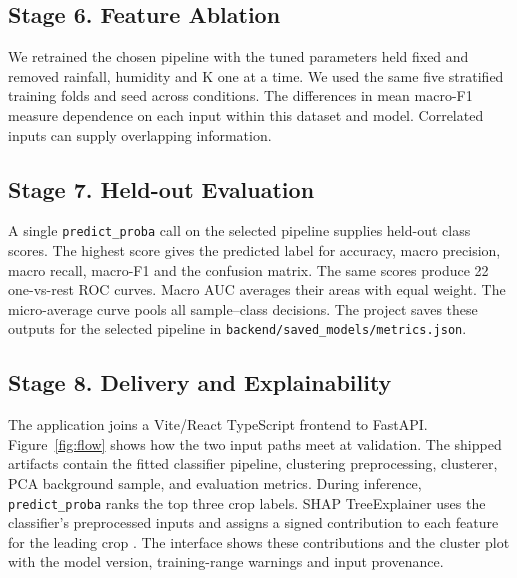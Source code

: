 \documentclass[conference]{IEEEtran}
\begin{document}
\subsection{Stage 6. Feature Ablation}
We retrained the chosen pipeline with the tuned parameters held fixed and removed rainfall, humidity and K one at a time. We used the same five stratified training folds and seed across conditions. The differences in mean macro-F1 measure dependence on each input within this dataset and model. Correlated inputs can supply overlapping information.

\subsection{Stage 7. Held-out Evaluation}
A single \texttt{predict\_proba} call on the selected pipeline supplies held-out class scores. The highest score gives the predicted label for accuracy, macro precision, macro recall, macro-F1 and the confusion matrix. The same scores produce 22 one-vs-rest ROC curves. Macro AUC averages their areas with equal weight. The micro-average curve pools all sample--class decisions. The project saves these outputs for the selected pipeline in \texttt{backend/saved\_models/metrics.json}.

\subsection{Stage 8. Delivery and Explainability}
The application joins a Vite/React TypeScript frontend to FastAPI. Figure~\ref{fig:flow} shows how the two input paths meet at validation. The shipped artifacts contain the fitted classifier pipeline, clustering preprocessing, clusterer, PCA background sample, and evaluation metrics. During inference, \texttt{predict\_proba} ranks the top three crop labels. SHAP TreeExplainer uses the classifier's preprocessed inputs and assigns a signed contribution to each feature for the leading crop \cite{shap}. The interface shows these contributions and the cluster plot with the model version, training-range warnings and input provenance.
\end{document}
